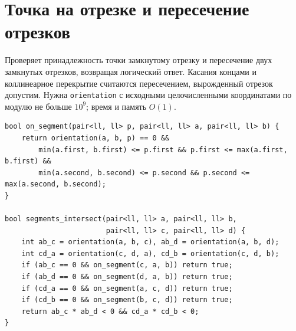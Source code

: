 \section{Точка на отрезке и пересечение отрезков}
Проверяет принадлежность точки замкнутому отрезку и пересечение двух замкнутых отрезков, возвращая логический ответ.
Касания концами и коллинеарное перекрытие считаются пересечением, вырожденный отрезок допустим.
Нужна \texttt{orientation} с исходными целочисленными координатами по модулю не больше $10^9$; время и память $O(1)$.
\begin{lstlisting}[name=geometry_segments]
bool on_segment(pair<ll, ll> p, pair<ll, ll> a, pair<ll, ll> b) {
    return orientation(a, b, p) == 0 &&
        min(a.first, b.first) <= p.first && p.first <= max(a.first, b.first) &&
        min(a.second, b.second) <= p.second && p.second <= max(a.second, b.second);
}

bool segments_intersect(pair<ll, ll> a, pair<ll, ll> b,
                        pair<ll, ll> c, pair<ll, ll> d) {
    int ab_c = orientation(a, b, c), ab_d = orientation(a, b, d);
    int cd_a = orientation(c, d, a), cd_b = orientation(c, d, b);
    if (ab_c == 0 && on_segment(c, a, b)) return true;
    if (ab_d == 0 && on_segment(d, a, b)) return true;
    if (cd_a == 0 && on_segment(a, c, d)) return true;
    if (cd_b == 0 && on_segment(b, c, d)) return true;
    return ab_c * ab_d < 0 && cd_a * cd_b < 0;
}
\end{lstlisting}
%

